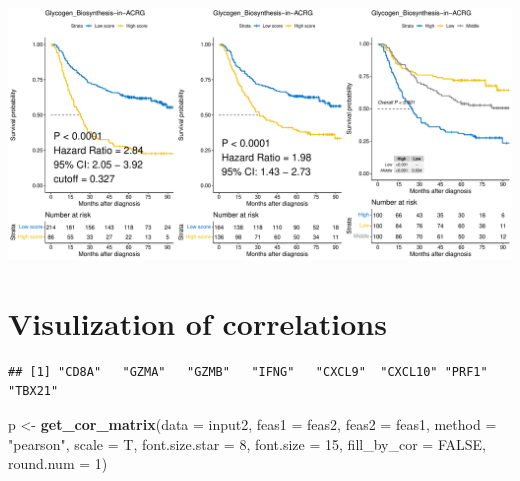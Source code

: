 \documentclass[
  12pt,
]{book}
\newenvironment{Shaded}{\begin{snugshade}}{\end{snugshade}}
\newcommand{\AttributeTok}[1]{\textcolor[rgb]{0.13,0.29,0.53}{#1}}
\newcommand{\ConstantTok}[1]{\textcolor[rgb]{0.56,0.35,0.01}{#1}}
\newcommand{\DecValTok}[1]{\textcolor[rgb]{0.00,0.00,0.81}{#1}}
\newcommand{\FunctionTok}[1]{\textcolor[rgb]{0.13,0.29,0.53}{\textbf{#1}}}
\newcommand{\NormalTok}[1]{#1}
\newcommand{\OtherTok}[1]{\textcolor[rgb]{0.56,0.35,0.01}{#1}}
\newcommand{\SpecialCharTok}[1]{\textcolor[rgb]{0.81,0.36,0.00}{\textbf{#1}}}
\newcommand{\StringTok}[1]{\textcolor[rgb]{0.31,0.60,0.02}{#1}}
\theoremstyle{definition}
\theoremstyle{definition}
\theoremstyle{definition}
\theoremstyle{definition}
\theoremstyle{remark}
\begin{document}
\includegraphics{_main_files/figure-latex/unnamed-chunk-41-1.pdf}

\hypertarget{visulization-of-correlations}{%
\section{Visulization of correlations}\label{visulization-of-correlations}}

\begin{Shaded}
\end{Shaded}

\begin{verbatim}
## [1] "CD8A"   "GZMA"   "GZMB"   "IFNG"   "CXCL9"  "CXCL10" "PRF1"   "TBX21"
\end{verbatim}

\begin{Shaded}
\begin{Highlighting}[]
\NormalTok{p }\OtherTok{\textless{}{-}} \FunctionTok{get\_cor\_matrix}\NormalTok{(}\AttributeTok{data           =}\NormalTok{ input2, }
                    \AttributeTok{feas1          =}\NormalTok{ feas2, }
                    \AttributeTok{feas2          =}\NormalTok{ feas1,}
                    \AttributeTok{method         =} \StringTok{"pearson"}\NormalTok{,}
                    \AttributeTok{scale          =}\NormalTok{ T, }
                    \AttributeTok{font.size.star =} \DecValTok{8}\NormalTok{, }
                    \AttributeTok{font.size      =} \DecValTok{15}\NormalTok{, }
                    \AttributeTok{fill\_by\_cor    =} \ConstantTok{FALSE}\NormalTok{, }
                    \AttributeTok{round.num      =} \DecValTok{1}\NormalTok{)}
\end{Highlighting}
\end{Shaded}
\end{document}
